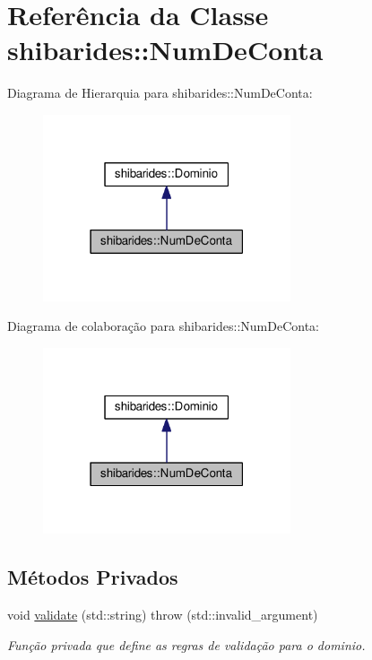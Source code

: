 \hypertarget{classshibarides_1_1NumDeConta}{}\section{Referência da Classe shibarides\+:\+:Num\+De\+Conta}
\label{classshibarides_1_1NumDeConta}


Diagrama de Hierarquia para shibarides\+:\+:Num\+De\+Conta\+:\nopagebreak
\begin{figure}[H]
\begin{center}
\leavevmode
\includegraphics[width=207pt]{classshibarides_1_1NumDeConta__inherit__graph}
\end{center}
\end{figure}


Diagrama de colaboração para shibarides\+:\+:Num\+De\+Conta\+:\nopagebreak
\begin{figure}[H]
\begin{center}
\leavevmode
\includegraphics[width=207pt]{classshibarides_1_1NumDeConta__coll__graph}
\end{center}
\end{figure}
\subsection*{Métodos Privados}
\begin{DoxyCompactItemize}
\item 
void \hyperlink{classshibarides_1_1NumDeConta_afe1c1bfd98ca97d59b521a6e7ac9d5ef}{validate} (std\+::string)  throw (std\+::invalid\+\_\+argument)
\begin{DoxyCompactList}\small\item\em Função privada que define as regras de validação para o dominio. \end{DoxyCompactList}\end{DoxyCompactItemize}
